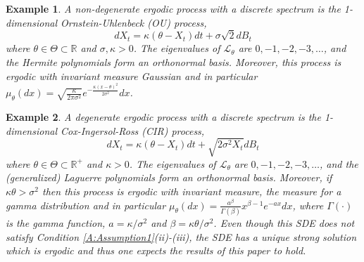 \documentclass{article}
\newtheorem{example}{Example}[section]
\begin{document}
\begin{example}\label{Ex:OU} A non-degenerate ergodic process with a discrete spectrum is the 1-dimensional Ornstein-Uhlenbeck (OU) process,
\[dX_t = \kappa(\theta - X_t)dt+\sigma\sqrt{2} dB_t\]
where $\theta\in\Theta\subset\mathbb R$ and $\sigma,\kappa>0$. The eigenvalues of $\mathcal L_\theta$ are $0,-1,-2,-3,\dots$, and the Hermite polynomials form an orthonormal basis. Moreover, this process is ergodic with invariant measure Gaussian and in particular $\mu_{\theta}(dx)=\sqrt{\frac{\kappa}{2\pi \sigma^2 }}e^{-\frac{\kappa(x-\theta)^{2}}{2\sigma^2}}dx$.
\end{example}
\begin{example}\label{Ex:CIR} A degenerate ergodic process with a discrete spectrum is the 1-dimensional Cox-Ingersol-Ross (CIR) process,
\[dX_t = \kappa(\theta - X_t)dt+\sqrt{2\sigma^2 X_t}dB_t\]
where $\theta\in\Theta\subset\mathbb R^+$ and $\kappa>0$. The eigenvalues of $\mathcal L_\theta$ are $0,-1,-2,-3,\dots$, and the (generalized) Laguerre polynomials form an orthonormal basis. Moreover,  if $\kappa \theta>\sigma^2$ then this process is ergodic with invariant measure, the measure for a gamma distribution and in particular $\mu_{\theta}(dx)=\frac{a^{\beta}}{\Gamma(\beta)}x^{\beta-1}e^{-a x}dx$, where $\Gamma(\cdot)$ is the gamma function, $a=\kappa/\sigma^2$ and $\beta=\kappa\theta/\sigma^2$. Even though this SDE does not satisfy Condition \ref{A:Assumption1}(ii)-(iii), the SDE has a unique strong solution which is ergodic and thus one expects the results of this paper to hold.
\end{example}
%
\end{document}
